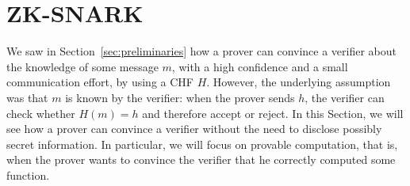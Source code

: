 \section{ZK-SNARK}\label{sec:zksnark}
We saw in Section~\ref{sec:preliminaries} how a prover can convince a verifier about the knowledge of
some message \(m\), with a high confidence and a small communication effort, by using a CHF \(H\).
However, the underlying assumption was that \(m\) is known by the verifier: when the prover sends
\(h\), the verifier can check whether \(H\left(m\right) = h\) and therefore accept or reject.
In this Section, we will see how a prover can convince a verifier without the need to disclose
possibly secret information.
In particular, we will focus on provable computation, that is, when the prover wants to convince
the verifier that he correctly computed some function.




